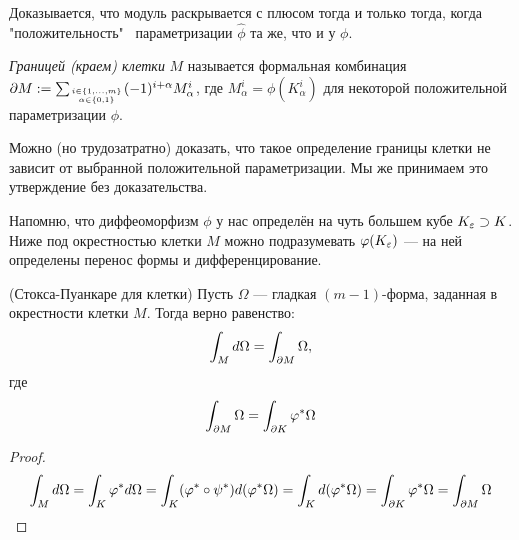 \begin{anote}
	Доказывается, что модуль раскрывается с плюсом тогда и только тогда, когда "положительность" \ параметризации $\hat{\phi}$ та же, что и у $\phi$.
\end{anote}

\begin{definition}
	\textit{Границей (краем) клетки} $M$ называется формальная комбинация $\partial M := \sum_{i \in \{1, \ldots, m\} \atop {\alpha \in \{0, 1\}}} (-1)^{i + \alpha} M_\alpha^i$, где $M_\alpha^i = \phi(K_\alpha^i)$ для некоторой положительной параметризации $\phi$.
\end{definition}

\begin{note}
	Можно (но трудозатратно) доказать, что такое определение границы клетки не зависит от выбранной положительной параметризации. Мы же принимаем это утверждение без доказательства.
\end{note}

\begin{reminder}
	Напомню, что диффеоморфизм $\phi$ у нас определён на чуть большем кубе $K_\varepsilon \supset K$. Ниже под окрестностью клетки $M$ можно подразумевать $\varphi(K_\varepsilon)$ --- на ней определены перенос формы и дифференцирование.
\end{reminder}

\begin{theorem} (Стокса-Пуанкаре для клетки)
	Пусть $\Omega$ --- гладкая $(m - 1)$-форма, заданная в окрестности клетки $M$. Тогда верно равенство:
	\[
		\int_M d\Omega = \int_{\partial M} \Omega,
	\]
	где
	\[
		\int_{\partial M} \Omega = \int_{\partial K} \varphi^*\Omega
	\]
\end{theorem}

\begin{proof}
	\[
		\int_M d\Omega = \int_K \varphi^* d\Omega = \int_K (\varphi^* \circ \psi^*) d(\varphi^* \Omega) = \int_K d(\varphi^*\Omega) = \int_{\partial K} \varphi^*\Omega = \int_{\partial M} \Omega
	\]
\end{proof}